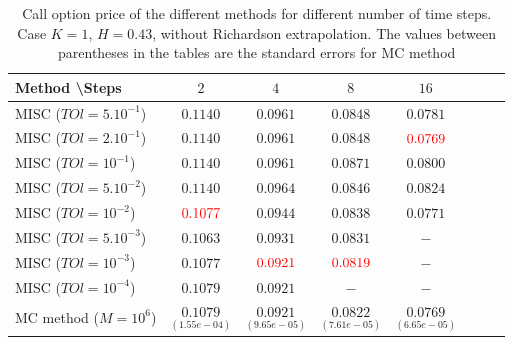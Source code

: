\documentclass[11pt]{article}
\begin{document}
\begin{table}[h!]
	\centering
	\begin{tabular}{l*{6}{c}r}
		Method \textbackslash  Steps            & $2$ & $4$ & $8$ & $16$ &   \\
		\hline
		MISC ($TOl=5.10^{-1}$)  & $0.1140$ & $0.0961$ & $0.0848$ & $0.0781$  \\
		MISC ($TOl=2.10^{-1}$)  & $0.1140$ & $0.0961$ & $0.0848$ & ${\color{red}0.0769}$  \\
		MISC ($TOl=10^{-1}$)  & $0.1140$ & $0.0961$ & $0.0871$ & $0.0800$  \\
		MISC ($TOl=5.10^{-2}$)  & $0.1140$ & $0.0964$ & $0.0846$ & $0.0824$  \\
		MISC ($TOl=10^{-2}$)  & ${\color{red}0.1077}$ & $0.0944$ & $0.0838$ & $0.0771$  \\
		MISC ($TOl=5.10^{-3}$)  & $0.1063$ & $0.0931$ & $0.0831$ & $-$  \\
		MISC ($TOl=10^{-3}$)  & $0.1077$ & ${\color{red}0.0921}$ & ${\color{red}0.0819}$ & $-$  \\
		MISC ($TOl=10^{-4}$)  & $0.1079$ & $0.0921$ & $-$ & $-$  \\
		MC method ($M=10^{6}$)   & $\underset{(1.55e-04)}{0.1079}$ & $ \underset{(9.65e-05)}{0.0921}$  & $ \underset{(7.61e-05)}{0.0822}$ & $ \underset{(6.65e-05)}{0.0769}$ \\		
		
		\hline
	\end{tabular}
	\caption{ Call option price of the different methods for different number of time steps. Case $K=1$, $H=0.43$, without Richardson extrapolation.  The values between parentheses in the tables are the standard errors for MC method}
	\label{table: Call option price of the different methods for different number of time steps. Case $K=1$, $H=0.43$}
\end{table}
\end{document}
